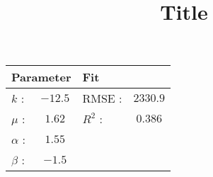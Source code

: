 \documentclass[11pt]{article} %
\title{Title}
\begin{document}
\begin{center}
\begin{tabular}{lclc}
 \multicolumn{2}{l}{Parameter} 	& \multicolumn{2}{l}{Fit } \\ \hline	 
 $k$ : 		& $-12.5$ 	& RMSE :	&  $2330.9$	  	\\
 $\mu$ :	& $1.62$	& $R^2$ :	&  	$0.386$  	\\
 $\alpha$ :	& $1.55$	&  			&  	  			\\
 $\beta$ :	& $-1.5$	& 	 		&
\end{tabular}
\label{unconstrained}
\end{center} 



\begin{sidewaystable}
\tiny
{}
\end{sidewaystable}
\end{document}

